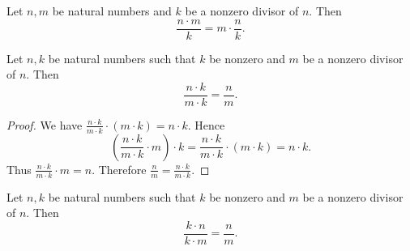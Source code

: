 \documentclass[10pt]{article}
\begin{document}
  \begin{forthel}
    \begin{corollary}[id=ARITHMETIC_14_7751120023654896,printid]
      Let $n, m$ be natural numbers and $k$ be a nonzero divisor of $n$.
      Then \[\frac{n \cdot m}{k} = m \cdot \frac{n}{k}.\]
    \end{corollary}
  \end{forthel}

  \begin{forthel}
    \begin{proposition}[id=ARITHMETIC_14_0531254868745988,printid]
      Let $n, k$ be natural numbers such that $k$ be nonzero and $m$ be a nonzero divisor of $n$.
      Then \[\frac{n \cdot k}{m \cdot k} = \frac{n}{m}.\]
    \end{proposition}
    \begin{proof}
      We have $\frac{n \cdot k}{m \cdot k} \cdot (m \cdot k) = n \cdot k$.
      Hence
      \[  \left( \frac{n \cdot k}{m \cdot k} \cdot m \right) \cdot k
          = \frac{n \cdot k}{m \cdot k} \cdot (m \cdot k)
          = n \cdot k. \]
      Thus $\frac{n \cdot k}{m \cdot k} \cdot m = n$.
      Therefore $\frac{n}{m} = \frac{n \cdot k}{m \cdot k}$.
    \end{proof}
  \end{forthel}

  \begin{forthel}
    \begin{corollary}[id=ARITHMETIC_14_7954254458622034,printid]
      Let $n, k$ be natural numbers such that $k$ be nonzero and $m$ be a nonzero divisor of $n$.
      Then \[\frac{k \cdot n}{k \cdot m} = \frac{n}{m}.\]
    \end{corollary}
  \end{forthel}
\end{document}
